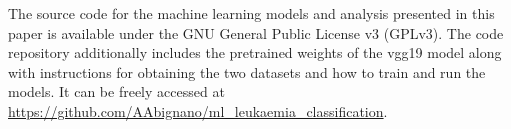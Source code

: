 \documentclass[
	a4paper,
	10pt,
	unnumberedsections,
	twoside,
]{research_article}
\begin{document}
The source code for the machine learning models and analysis presented in this paper is available under the GNU General Public License v3 (GPLv3). The code repository additionally includes the pretrained weights of the vgg19 model along with instructions for obtaining the two datasets and how to train and run the models. It can be freely accessed at \url{https://github.com/AAbignano/ml\_leukaemia\_classification}.


\newpage

\nocite{*}




\end{document}
